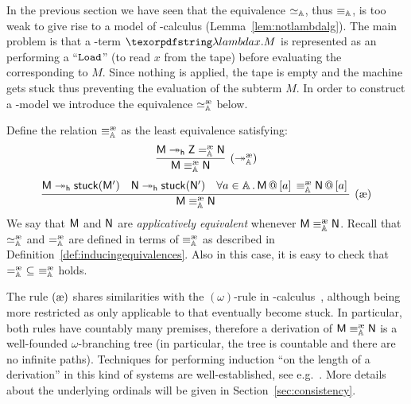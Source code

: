 
In the previous section we have seen that the equivalence $\simeq_{\mathbb{A}}$, thus $\equiv_{\mathbb{A}}$, is too weak to give rise to a model of \lam-calculus (Lemma~\ref{lem:notlambdalg}).
The main problem is that a \lam-term $\lam x.M$ is represented as an \am{} performing a ``$\mathtt{Load}$'' (to read $x$ from the tape) before evaluating the \am{} corresponding to $M$. Since nothing is applied, the tape is empty and the machine gets stuck thus preventing the evaluation of the subterm $M$.
In order to construct a \lam-model we introduce the equivalence $\simea$ below.

\begin{defi}
Define the relation $\equivea$ as the least equivalence satisfying:
\begin{gather*}
	\infer[\redwerule]{\mM \equivea \mN}{\mM\reddh \mZ \eqea \mN}
	\\[3pt]
	\infer[\extrule]{\mM \equivea \mN}{
		\mach{M}\reddh\stuck{\mM'}&
		\mN\reddh\stuck{\mN'}&
		\forall a\in\Addrs\,.\, \append{\mM}{a} \equivea \append{\mN}{a}
	}
\end{gather*}
We say that $\mathsf M$ and $\mathsf N$ are \emph{applicatively equivalent} whenever $\mM\equivea \mN$. Recall that $\simea$ and $\eqea$ are defined in terms of $\equivea$ as described in Definition~\ref{def:inducingequivalences}.
Also in this case, it is easy to check that $\eqea\ \subseteq\ \equivea$ holds.
\end{defi}

\begin{rem}\label{rem:aboutordinals} The rule $\extrule$ shares similarities with the $(\omega)$-rule in \lam-calculus~\cite[Def.~4.1.10]{Bare}, although being more restricted as only applicable to \am{} that eventually become stuck. In particular, both rules have countably many premises, therefore a derivation of $\mM\equivea\mN$ is a well-founded $\omega$-branching tree (in particular, the tree is countable and there are no infinite paths).
Techniques for performing induction ``on the length of a derivation'' in this kind of systems are well-established, see e.g.~\cite{BarendregtTh,IntrigilaS06}. More details about the underlying ordinals will be given in Section~\ref{sec:consistency}.
\end{rem}

